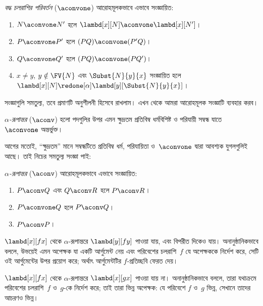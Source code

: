 \documentclass[../../../include/open-logic-section]{subfiles}
\begin{document}
\begin{defn} 
  \emph{বদ্ধ চলরাশির পরিবর্তন} ($\aconvone$) আরোহমূলকভাবে এভাবে
  সংজ্ঞায়িত:
  \begin{enumerate}
  \item $N \aconvone N'$ হলে $\lambd[x][N] \aconvone
    \lambd[x][N']$। 
  \item $P \aconvone P'$ হলে $(PQ) \aconvone (P'Q)$। 
  \item $Q \aconvone Q'$ হলে $(PQ) \aconvone (PQ')$। 
  \item $x \neq y$, $y \notin \FV{N}$ এবং $\Subst{N}{y}{x}$ সংজ্ঞায়িত হলে
    $\lambd[x][N] \redone[\alpha] \lambd[y][\Subst{N}{y}{x}]$।
  \end{enumerate}
\end{defn}

সংজ্ঞাগুলি সমতুল্য, তবে প্রমাণটি অনুশীলনী হিসেবে রাখলাম। এখন থেকে আমরা
আরোহমূলক সংজ্ঞাটি ব্যবহার করব।

\begin{defn}
  \emph{$\alpha$-রূপান্তর} ($\aconv$) হলো পদগুলির উপর এমন ক্ষুদ্রতম
  প্রতিবিম্ব ধর্মবিশিষ্ট ও পরিযায়ী সম্বন্ধ যাতে~$\aconvone$ অন্তর্ভুক্ত।
\end{defn}

আগের মতোই, ``ক্ষুদ্রতম'' মানে সম্বন্ধটিতে প্রতিবিম্ব ধর্ম, পরিযায়িতা
ও~$\aconvone$ দ্বারা আবশ্যক যুগলগুলিই আছে। তাই নিচের সমতুল্য সংজ্ঞা পাই:

\begin{defn} 
  \emph{$\alpha$-রূপান্তর} ($\aconv$) আরোহমূলকভাবে এভাবে সংজ্ঞায়িত:
  \begin{enumerate}
  \item $P \aconv Q$ এবং $Q \aconv R$ হলে $P \aconv R$।
  \item $P \aconvone Q$ হলে $P \aconv Q$। 
  \item $P \aconv P$। 
  \end{enumerate}
\end{defn}

\begin{ex}
  $\lambd[x][f x]$ থেকে $\alpha$-রূপান্তরে $\lambd[y][f y]$ পাওয়া
  যায়, এবং বিপরীত দিকেও যায়। অনানুষ্ঠানিকভাবে বললে, উভয়েই এমন অপেক্ষক
  যা একটি আর্গুমেন্ট নেয় এবং পরিবেশের চলরাশি~$f$ যে অপেক্ষককে নির্দেশ
  করে, সেটি ওই আর্গুমেন্টের উপর প্রয়োগ করে; অর্থাৎ আর্গুমেন্টটির
  $f$-প্রতিচ্ছবি ফেরত দেয়।

  $\lambd[x][f x]$ থেকে $\alpha$-রূপান্তরে $\lambd[x][g x]$ পাওয়া
  যায় না। অনানুষ্ঠানিকভাবে বললে, তারা যথাক্রমে পরিবেশের চলরাশি~$f$ ও~$g$-কে
  নির্দেশ করে; তাই তারা ভিন্ন অপেক্ষক: যে পরিবেশে $f$ ও~$g$ ভিন্ন, সেখানে
  তাদের আচরণও ভিন্ন।
\end{ex}
\end{document}
